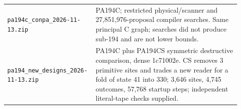 \begin{longtable}{@{}p{0.34\linewidth}p{0.61\linewidth}@{}}
\nolinkurl{pa194c_conpa_2026-11-13.zip} & PA194C; restricted physical/scanner and 27,851,976-proposal compiler searches. Same principal C graph; searches did not produce sub-194 and are not lower bounds. \\[5pt]
\nolinkurl{pa194_new_designs_2026-11-13.zip} & PA194C plus PA194CS symmetric destructive comparison, dense 1c71002e. CS removes 3 primitive sites and trades a new reader for a fold of state 41 into 330; 3,646 sites, 4,745 outcomes, 57,768 startup steps; independent literal-tape checks supplied. \\[5pt]
\end{longtable}
\normalsize
